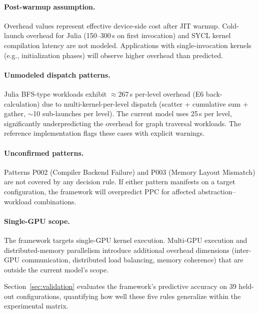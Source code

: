 \paragraph{Post-warmup assumption.}
Overhead values represent effective device-side cost after JIT warmup.
Cold-launch overhead for Julia (150--300\,\textmu{}s on first invocation) and
SYCL kernel compilation latency are not modeled. Applications with
single-invocation kernels (e.g., initialization phases) will observe higher
overhead than predicted.

\paragraph{Unmodeled dispatch patterns.}
Julia BFS-type workloads exhibit $\approx 267$\,\textmu{}s per-level
overhead (E6 back-calculation) due to multi-kernel-per-level dispatch
(scatter + cumulative sum + gather, $\sim$10 sub-launches per level). The
current model uses 25\,\textmu{}s per level, significantly underpredicting
the overhead for graph traversal workloads. The reference implementation
flags these cases with explicit warnings.

\paragraph{Unconfirmed patterns.}
Patterns P002 (Compiler Backend Failure) and P003 (Memory Layout Mismatch)
are not covered by any decision rule. If either pattern manifests on a
target configuration, the framework will overpredict PPC for affected
abstraction--workload combinations.

\paragraph{Single-GPU scope.}
The framework targets single-GPU kernel execution. Multi-GPU execution and
distributed-memory parallelism introduce additional overhead dimensions
(inter-GPU communication, distributed load balancing, memory coherence)
that are outside the current model's scope.

\medskip
\noindent Section~\ref{sec:validation} evaluates the framework's predictive
accuracy on 39 held-out configurations, quantifying how well these five
rules generalize within the experimental matrix.
